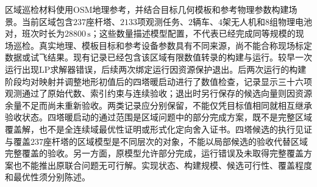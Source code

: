 区域巡检材料使用OSM地理参考，并结合目标几何模板和参考物理参数构建场景。当前区域包含$237$座杆塔、$2133$项观测任务、$2$辆车、$4$架无人机和$8$组物理电池对，班次时长为$28800\,\mathrm{s}$；这些数量描述模型配置，不代表已经完成同等规模的现场巡检。真实地理、模板目标和参考设备参数具有不同来源，尚不能合称现场标定数据或试飞结果。现有记录已经包含该区域有限数值转录的构建与运行。较早一次运行出现LP求解器错误，后续两次绑定运行因资源保护退出。后两次运行的构建阶段均对映射并调整地形初值后的四塔暖启动进行了数值检查，记录显示三十六项观测通过了原始代数、索引约束与连续验收；退出时另行保存的候选向量则因资源余量不足而尚未重新验收。两类记录应分别保留，不能仅凭目标值相同就相互继承验收状态。四塔暖启动的通过范围是区域问题中的部分完成方案，既不是完整区域覆盖解，也不是全连续域最优性证明或形式化定向舍入证书。四塔候选的执行见证与覆盖$237$座杆塔的区域模型是不同层次的对象，不能以局部候选的验收代替区域完整覆盖的验收。另一方面，原模型允许部分完成，运行错误及未取得完整覆盖方案也不能推出原联合问题无可行解。实现状态、构建规模、候选可行性、覆盖程度和最优性须分别陈述。
